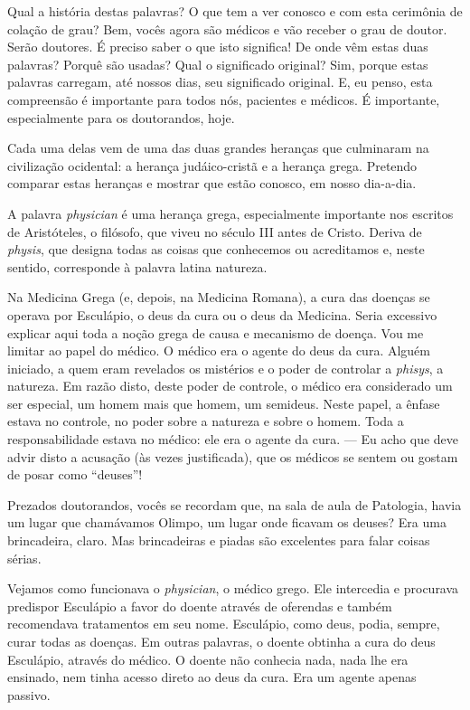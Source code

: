\documentclass[pdftex, brazil, 12pt, oneside]{article}
\newcommand{\ingles}[1]{\textit{#1}}
\begin{document}
Qual a história destas palavras? O que tem a ver conosco e com esta cerimônia de colação de grau?
Bem, vocês agora são médicos e vão receber o grau de doutor. Serão doutores. É preciso saber o
que isto significa! De onde vêm estas duas palavras? Porquê são usadas? Qual o significado
original? Sim, porque estas palavras carregam, até nossos dias, seu significado original.
E, eu penso, esta compreensão é importante para todos nós, pacientes e médicos. É importante,
especialmente para os doutorandos, hoje.

Cada uma delas vem de uma das duas grandes heranças que culminaram na civilização ocidental:
a herança judáico-cristã e a herança grega. Pretendo comparar estas heranças e mostrar
que estão conosco, em nosso dia-a-dia.

A palavra \ingles{physician} é uma herança grega, especialmente importante nos escritos de
Aristóteles, o filósofo, que viveu no século III antes de Cristo. Deriva de \ingles{physis}, que
designa todas as coisas que conhecemos ou acreditamos e, neste sentido, corresponde à palavra
latina natureza.

Na Medicina Grega (e, depois, na Medicina Romana), a cura das doenças se operava por Esculápio,
o deus da cura ou o deus da Medicina. Seria excessivo explicar aqui toda a noção grega de
causa e mecanismo de doença. Vou me limitar ao papel do médico.
O médico era o agente do deus
da cura. Alguém iniciado, a quem eram revelados os mistérios e o poder de controlar a
\ingles{phisys}, a natureza. Em razão disto, deste poder de controle, o médico era considerado
um ser especial, um homem mais que homem, um semideus. Neste papel, a ênfase estava no controle,
no poder sobre a natureza e sobre o homem. Toda a responsabilidade estava no médico: ele era
o agente da cura. --- Eu acho que deve advir disto a acusação (às vezes justificada), que os
médicos se sentem ou gostam de posar como ``deuses''!

Prezados doutorandos, vocês se recordam que, na sala de aula de Patologia, havia um lugar que
chamávamos Olimpo, um lugar onde ficavam os deuses? Era uma brincadeira, claro. Mas
brincadeiras e piadas são excelentes para falar coisas sérias.

Vejamos como funcionava o \ingles{physician}, o médico grego. Ele intercedia e procurava predispor
Esculápio a favor do doente através de oferendas e também recomendava tratamentos em seu nome.
Esculápio, como deus, podia, sempre, curar todas as doenças. Em outras palavras, o doente obtinha
a cura do deus Esculápio, através do médico. O doente não conhecia nada, nada lhe era ensinado,
nem tinha acesso direto ao deus da cura. Era um agente apenas passivo.
\end{document}

